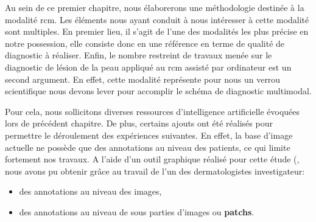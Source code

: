 Au sein de ce premier chapitre, nous élaborerons une méthodologie destinée à la modalité \gls{rcm}. Les éléments nous ayant conduit à nous intéresser à cette modalité sont multiples. En premier lieu, il s'agit de l'une des modalités les plus précise en notre possession, elle consiste donc en une référence en terme de qualité de diagnostic à réaliser. Enfin, le nombre restreint de travaux menée sur le diagnostic de lésion de la peau appliqué au \gls{rcm} assisté par ordinateur est un second argument. En effet, cette modalité représente pour nous un verrou scientifique nous devons lever pour accomplir le schéma de diagnostic multimodal.\par

Pour cela, nous sollicitons diverses ressources d'intelligence artificielle évoquées lors de précédent chapitre. De plus, certains ajouts ont été réalisés pour permettre le déroulement des expériences suivantes. En effet, la base d'image actuelle ne possède que des annotations au niveau des patients, ce qui limite fortement nos travaux.
A l'aide d'un outil graphique réalisé pour cette étude (, nous avons pu obtenir grâce au travail de l'un des dermatologistes investigateur:
\begin{itemize}
\item des annotations au niveau des images,
\item des annotations au niveau de sous parties d'images ou \textbf{patchs}.
\end{itemize}\par

